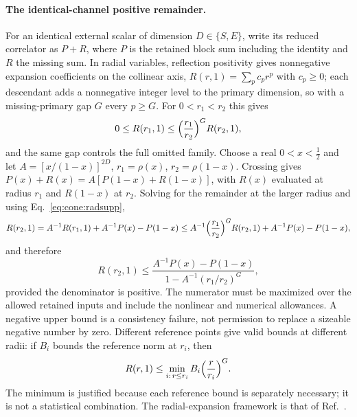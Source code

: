 \documentclass[11pt,a4paper]{article}
\numberwithin{equation}{section}
\begin{document}
\paragraph{The identical-channel positive remainder.} For an identical external scalar of dimension $D\in\{S,E\}$, write
its reduced correlator as $P+R$, where $P$ is the retained block sum including the identity and $R$ the missing sum. In
radial variables, reflection positivity gives nonnegative expansion coefficients on the collinear axis,
$R(r,1)=\sum_pc_pr^p$ with $c_p\ge0$; each descendant adds a nonnegative integer level to the primary dimension, so with
a missing-primary gap $G$ every $p\ge G$. For $0<r_1<r_2$ this gives
\begin{equation}
 0\le R(r_1,1)\le\Bigl(\frac{r_1}{r_2}\Bigr)^GR(r_2,1),
 \label{eq:cone:radsupp}
\end{equation}
and the same gap controls the full omitted family. Choose a real $0<x<\frac12$ and let $A=[x/(1-x)]^{2D}$,
$r_1=\rho(x)$, $r_2=\rho(1-x)$. Crossing gives $P(x)+R(x)=A[P(1-x)+R(1-x)]$, with $R(x)$ evaluated at radius $r_1$ and
$R(1-x)$ at $r_2$. Solving for the remainder at the larger radius and using Eq.~\eqref{eq:cone:radsupp},
\begin{equation}
 R(r_2,1)=A^{-1}R(r_1,1)+A^{-1}P(x)-P(1-x)\le A^{-1}\Bigl(\frac{r_1}{r_2}\Bigr)^GR(r_2,1)+A^{-1}P(x)-P(1-x),
\end{equation}
and therefore
\begin{equation}
 R(r_2,1)\le\frac{A^{-1}P(x)-P(1-x)}{1-A^{-1}(r_1/r_2)^G},
 \label{eq:cone:anchor}
\end{equation}
provided the denominator is positive. The numerator must be maximized over the allowed retained inputs and include the
nonlinear and numerical allowances. A negative upper bound is a consistency failure, not permission to replace a
sizeable negative number by zero. Different reference points give valid bounds at different radii: if $B_i$ bounds the
reference norm at $r_i$, then
\begin{equation}
 R(r,1)\le\min_{i:\,r\le r_i}B_i\Bigl(\frac{r}{r_i}\Bigr)^G .
 \label{eq:cone:anchormin}
\end{equation}
The minimum is justified because each reference bound is separately necessary; it is not a statistical combination.
The radial-expansion framework is that of Ref.~\cite{Hogervorst:2013}.
\end{document}
